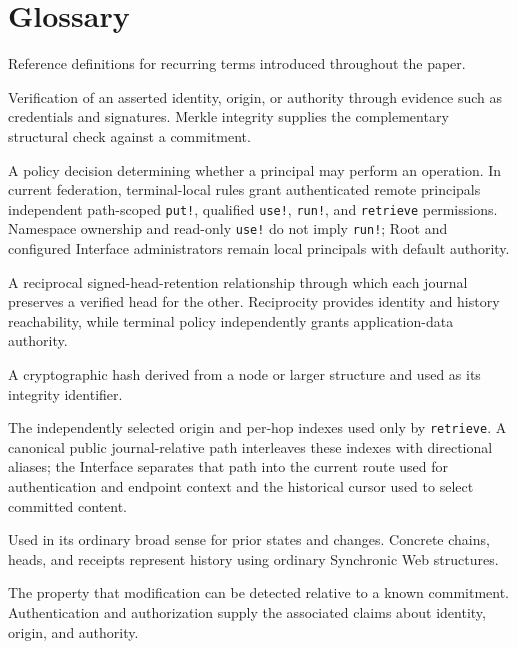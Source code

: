 \section*{Glossary}
\label{sec:glossary}

Reference definitions for recurring terms introduced throughout the paper.

\begin{description}[style=nextline]
  \item[Authentication]
    Verification of an asserted identity, origin, or authority through evidence such as credentials and signatures. Merkle integrity supplies the complementary structural check against a commitment.

  \item[Authorization]
    A policy decision determining whether a principal may perform an operation. In current federation, terminal-local rules grant authenticated remote principals independent path-scoped \texttt{put!}, qualified \texttt{use!}, \texttt{run!}, and \texttt{retrieve} permissions. Namespace ownership and read-only \texttt{use!} do not imply \texttt{run!}; Root and configured Interface administrators remain local principals with default authority.

  \item[Bridge]
    A reciprocal signed-head-retention relationship through which each journal preserves a verified head for the other. Reciprocity provides identity and history reachability, while terminal policy independently grants application-data authority.

  \item[Digest]
    A cryptographic hash derived from a node or larger structure and used as its integrity identifier.

  \item[Historical cursor]
    The independently selected origin and per-hop indexes used only by \texttt{retrieve}. A canonical public journal-relative path interleaves these indexes with directional aliases; the Interface separates that path into the current route used for authentication and endpoint context and the historical cursor used to select committed content.

  \item[History]
    Used in its ordinary broad sense for prior states and changes. Concrete chains, heads, and receipts represent history using ordinary Synchronic Web structures.

  \item[Integrity]
    The property that modification can be detected relative to a known commitment. Authentication and authorization supply the associated claims about identity, origin, and authority.


\end{description}
